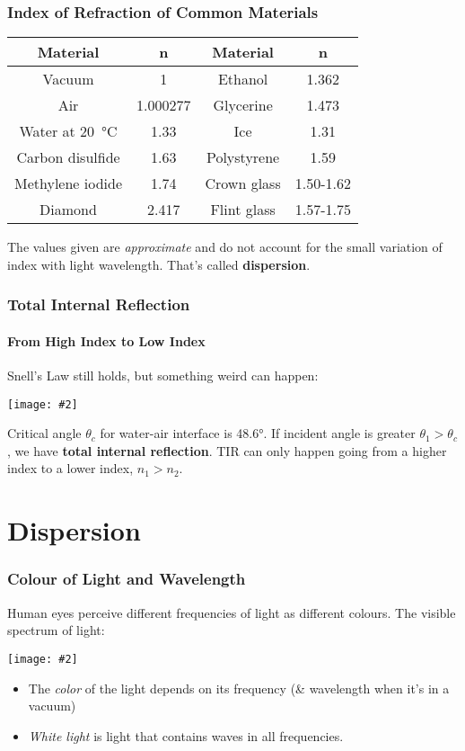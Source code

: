 \documentclass[compress,aspectratio=169]{beamer}
\newcommand{\pic}[2]{\texttt{[image: \#2]}}
\begin{document}
\begin{frame}
  \frametitle{Index of Refraction of Common Materials}
  \begin{center}
    \begin{tabular}{c|c||c|c}
      \rowcolor{pink}
      \textbf{Material} & \textbf{n} & \textbf{Material} & \textbf{n}\\ \hline
      Vacuum           & 1        & Ethanol     & 1.362 \\
      Air              & 1.000277 & Glycerine   & 1.473 \\
      Water at \SI{20}{\celsius} & 1.33 & Ice         & 1.31 \\
      Carbon disulfide & 1.63     & Polystyrene & 1.59 \\
      Methylene iodide & 1.74     & Crown glass & 1.50-1.62\\
      Diamond          & 2.417    & Flint glass & 1.57-1.75\\
    \end{tabular}
  \end{center}
  
  \vspace{0.2in}
  The values given are \emph{approximate} and do not account for the small
  variation of index with light wavelength. That's called \textbf{dispersion}.
\end{frame}



\begin{frame}
  \frametitle{Total Internal Reflection}
  \framesubtitle{From High Index to Low Index}
  Snell's Law still holds, but something weird can happen:
  \begin{center}
    \pic{0.8}{graphics/660px-RefractionReflextion.png}
  \end{center}
  Critical angle $\theta_c$ for water-air interface is \ang{48.6}. If
  incident angle is greater $\theta_1>\theta_c$, we have
  \textbf{total internal reflection}. TIR can only happen going from a higher
  index to a lower index, $n_1>n_2$.
\end{frame}


\section{Dispersion}

\begin{frame}
  \frametitle{Colour of Light and Wavelength}
  Human eyes perceive different frequencies of light as different colours.
  The visible spectrum of light:
  \begin{center}
    \pic{.45}{graphics/visiblespectrum.png}
  \end{center}
  \begin{itemize}
  \item The \emph{color} of the light depends on its frequency (\& wavelength
    when it's in a vacuum)
  \item \emph{White light} is light that contains waves in all frequencies.
  \end{itemize}
\end{frame}
\end{document}
